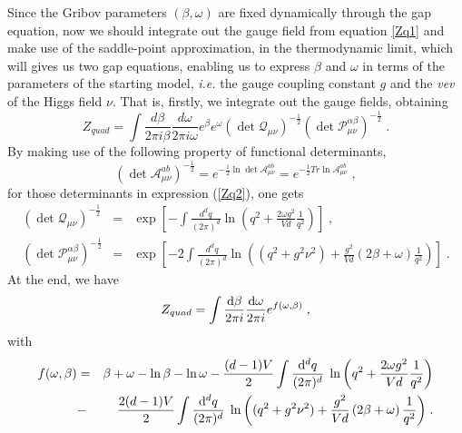 Since the Gribov parameters $(\beta, \omega)$ are fixed dynamically through the gap equation,
now we should integrate out the gauge field from equation \eqref{Zq1} and make use of the
saddle-point approximation, in the thermodynamic limit, which will gives us two gap equations,
enabling us to express $\beta$ and $\omega$ in terms of the parameters of the starting model,
{\it i.e.} the gauge coupling constant $g$ and the {\it vev} of the Higgs field $\nu$. That is,
firstly, we integrate out the gauge fields, obtaining
\begin{equation}
Z_{quad}=\int{\frac{d\beta}{2\pi i\beta}\frac{d\omega}{2\pi i\omega}}%
e^{\beta}e^{\omega}\left(\det\mathcal{Q}_{\mu\nu}\right)^{-\frac{1}{2}%
}\left(\det\mathcal{P}^{\alpha\beta}_{\mu\nu}\right)^{-\frac{1}{2}} \;.
\label{Zq2}
\end{equation}
By making use of the following property of functional determinants,
\begin{equation}
\left(\det \mathcal{A}_{\mu\nu}^{ab}\right)^{-\frac{1}{2}}=e^{-\frac{1}{2}%
\ln \det \mathcal{A}_{\mu\nu}^{ab}}=e^{-\frac{1}{2}Tr \ln \mathcal{A}%
_{\mu\nu}^{ab}} \;,
\end{equation}
for those determinants in expression (\ref{Zq2}), one gets
\begin{eqnarray}
\left( \det \mathcal{Q}_{\mu \nu }\right) ^{-\frac{1}{2}} &=&\exp \left[
-\int {\frac{d^{d}q}{(2\pi )^{d}}\ln \left( q^{2}+\frac{2\omega
g^{2}}{Vd}\frac{1}{q^{2}}\right) }\right] \;, \nonumber \\
\left( \det \mathcal{P}_{\mu \nu }^{\alpha \beta }\right) ^{-\frac{1}{2}}
&=&\exp \left[ -2\int {\frac{d^{d}q}{(2\pi )^{d}}\ln \left(
(q^{2}+g^{2}\nu^{2}) + \frac{g^{2}}{Vd} \left( 2\beta + \omega \right)
\frac{1}{q^{2}}\right) }\right] \;.
\end{eqnarray}
At the end, we have
\begin{equation}  \label{Zq3}
Z_{quad}=\int{\frac{\ensuremath{\mathrm{d}}\beta}{2\pi i}\frac{\ensuremath{\mathrm{d}}\omega}{2\pi i}}e^{f(\omega,\beta)} \;,
\end{equation}
with
\begin{eqnarray}\label{Zq4}
f(\omega ,\beta ) &=& \beta +\omega -\ln \beta -\ln \omega - \frac{(d-1)V}{2}  \int
{\frac{\ensuremath{\mathrm{d}}^{d}q}{(2\pi )^{d}}  \; \ln \left( q^{2}+\frac{2\omega
g^{2}}{Vd}\frac{1}{q^{2}}\right)
} \nonumber  \\
&-&  \frac{2(d-1)V}{2}  \int {\frac{\ensuremath{\mathrm{d}}^{d}q}{(2\pi)^{d}}  \; \ln \left((q^{2}+g^{2}\nu^{2}) + \frac{g^{2}}{Vd} \left( 2\beta + \omega \right)
\frac{1}{q^{2}}\right) } \;.
\end{eqnarray}
